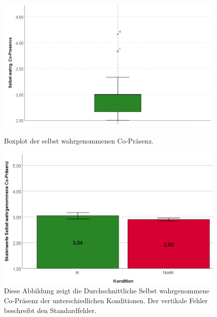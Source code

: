 \documentclass[a4paper,11pt]{article}%
\renewcommand{\\}{\vspace*{0.5\baselineskip} \newline}
\begin{document}
	\begin{figure}[H]
   \begin{minipage}[t]{.5\linewidth} %
      \includegraphics[width=\linewidth]{Abbildungen/AuswertungDiagramme/BP_SelfCoPresence.png}
      \caption[Boxplot der selbst wahrgenommenen Co-Präsenz]{Boxplot der selbst wahrgenommenen Co-Präsenz.}
            \label{SD_SelfCoPresenceBP}
   \end{minipage}
   \hspace{.02\linewidth}%
   \begin{minipage}[t]{.5\linewidth} %
     \includegraphics[width=\linewidth]{Abbildungen/AuswertungDiagramme/SD_SelbstCoPresence_Mittelwerte.png}
      \caption[Durchschnittlich Selbst wahrgenommene Co-Präsenz der Konditionen]{Diese Abbildung zeigt die Durchschnittliche Selbst wahrgenommene Co-Präsenz der unterschiedlichen Konditionen. Der vertikale Fehler beschreibt den Standardfehler.}
       \label{SD_SelbstCoPresence_Mittelwerte}
   \end{minipage}
\end{figure}
\end{document}
